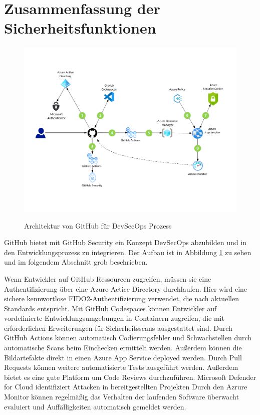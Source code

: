 \section{Zusammenfassung der Sicherheitsfunktionen}
\begin{figure}[H]
	{\caption{Architektur von GitHub für DevSecOps Prozess}
		\label{FIG:devsecops-in-github}}
	{\includegraphics[width=1\textwidth]{figures/devsecops-in-github.png}}
\end{figure}
GitHub bietet mit GitHub Security ein Konzept DevSecOps abzubilden und in den Entwicklungsprozess zu integrieren. Der Aufbau ist in Abbildung \ref{FIG:devsecops-in-github} zu sehen und im folgendem Abschnitt grob beschrieben.

Wenn Entwickler auf GitHub Ressourcen zugreifen, müssen sie eine Authentifizierung über eine Azure Actice Directory durchlaufen. Hier wird eine sichere kennwortlose  FIDO2-Authentifizierung verwendet, die nach aktuellen Standards entspricht. \cite{fido2}
Mit GitHub Codespaces können Entwickler auf vordefinierte Entwicklungsumgebungen in Containern zugreifen, die mit erforderlichen Erweiterungen für Sicherheitsscans ausgestattet sind.
Durch GitHub Actions können automatisch Codierungsfehler und Schwachstellen durch automatische Scans beim Einchecken ermittelt werden.
Außerdem können die Bildartefakte direkt in einen Azure App Service deployed werden.
Durch Pull Requests können weitere automatisierte Tests ausgeführt werden. Außerdem bietet es eine gute Platform um Code Reviews durchzuführen.
Microsoft Defender for Cloud identifiziert Attacken in bereitgestellten Projekten
Durch den Azrure Monitor können regelmäßig das Verhalten der laufenden Software überwacht evaluiert und Auffälligkeiten automatisch gemeldet werden.\cite{devsecops-github}

